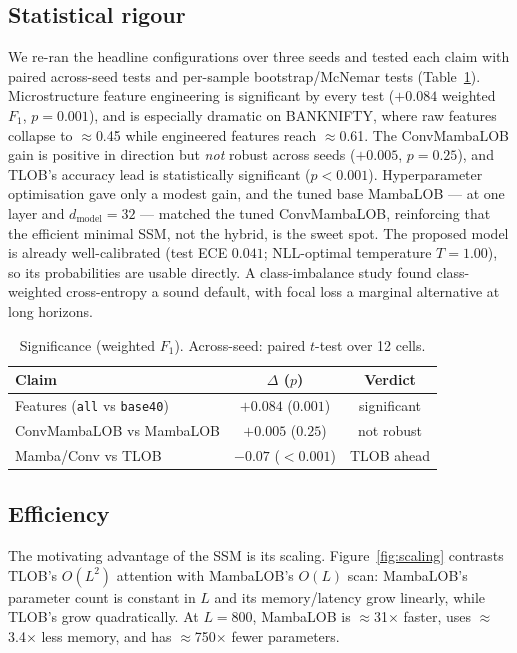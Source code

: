 \documentclass[fonts]{icst}
\begin{document}
\subsection{Statistical rigour}
We re-ran the headline configurations over three seeds and tested each claim with paired across-seed tests
and per-sample bootstrap/McNemar tests (Table~\ref{tab:sig}). Microstructure feature engineering is
significant by every test ($+0.084$ weighted $F_1$, $p{=}0.001$), and is especially dramatic on BANKNIFTY,
where raw features collapse to $\approx$0.45 while engineered features reach $\approx$0.61. The ConvMambaLOB
gain is positive in direction but \emph{not} robust across seeds ($+0.005$, $p{=}0.25$), and TLOB's accuracy
lead is statistically significant ($p{<}0.001$). Hyperparameter optimisation gave only a modest gain, and the
tuned base MambaLOB --- at one layer and $d_{\mathrm{model}}{=}32$ --- matched the tuned ConvMambaLOB,
reinforcing that the efficient minimal SSM, not the hybrid, is the sweet spot. The proposed model is already
well-calibrated (test ECE $0.041$; NLL-optimal temperature $T{=}1.00$), so its probabilities are usable
directly. A class-imbalance study found class-weighted cross-entropy a sound default, with focal loss a
marginal alternative at long horizons.

\begin{table}[t]
\centering\footnotesize
\caption{Significance (weighted $F_1$). Across-seed: paired $t$-test over 12 cells.}
\label{tab:sig}
\begin{tabular}{@{}lcc@{}}
\toprule
Claim & $\Delta$ ($p$) & Verdict \\
\midrule
Features (\texttt{all} vs \texttt{base40}) & $+0.084$ ($0.001$) & significant \\
ConvMambaLOB vs MambaLOB & $+0.005$ ($0.25$) & not robust \\
Mamba/Conv vs TLOB       & $-0.07$ ($<0.001$) & TLOB ahead \\
\bottomrule
\end{tabular}
\end{table}

\subsection{Efficiency}
The motivating advantage of the SSM is its scaling. Figure~\ref{fig:scaling} contrasts TLOB's $O(L^2)$
attention with MambaLOB's $O(L)$ scan: MambaLOB's parameter count is constant in $L$ and its memory/latency
grow linearly, while TLOB's grow quadratically. At $L{=}800$, MambaLOB is $\approx$31$\times$ faster, uses
$\approx$3.4$\times$ less memory, and has $\approx$750$\times$ fewer parameters.
\end{document}

